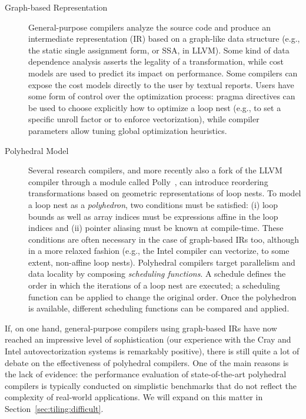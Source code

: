 \begin{description}
\item[Graph-based Representation] General-purpose compilers analyze the source code and produce an intermediate representation (IR) based on a graph-like data structure (e.g., the static single assignment form, or SSA, in LLVM). Some kind of data dependence analysis asserts the legality of a transformation, while cost models are used to predict its impact on performance. Some compilers can expose the cost models directly to the user by textual reports. Users have some form of control over the optimization process: pragma directives can be used to choose explicitly how to optimize a loop nest (e.g., to set a specific unroll factor or to enforce vectorization), while compiler parameters allow tuning global optimization heuristics. 
\item[Polyhedral Model] Several research compilers, and more recently also a fork of the LLVM compiler through a module called Polly~\citep{polly}, can introduce reordering transformations based on geometric representations of loop nests. To model a loop nest as a {\em polyhedron}, two conditions must be satisfied: (i) loop bounds as well as array indices must be expressions affine in the loop indices and (ii) pointer aliasing must be known at compile-time. These conditions are often necessary in the case of graph-based IRs too, although in a more relaxed fashion (e.g., the Intel compiler can vectorize, to some extent, non-affine loop nests). Polyhedral compilers target parallelism and data locality by composing {\em scheduling functions}. A schedule defines the order in which the iterations of a loop nest are executed; a scheduling function can be applied to change the original order. Once the polyhedron is available, different scheduling functions can be compared and applied.
\end{description}


If, on one hand, general-purpose compilers using graph-based IRs have now reached an impressive level of sophistication (our experience with the Cray and Intel autovectorization systems is remarkably positive), there is still quite a lot of debate on the effectiveness of polyhedral compilers. One of the main reasons is the lack of evidence: the performance evaluation of state-of-the-art polyhedral compilers is typically conducted on simplistic benchmarks that do not reflect the complexity of real-world applications. We will expand on this matter in Section~\ref{sec:tiling:difficult}.

